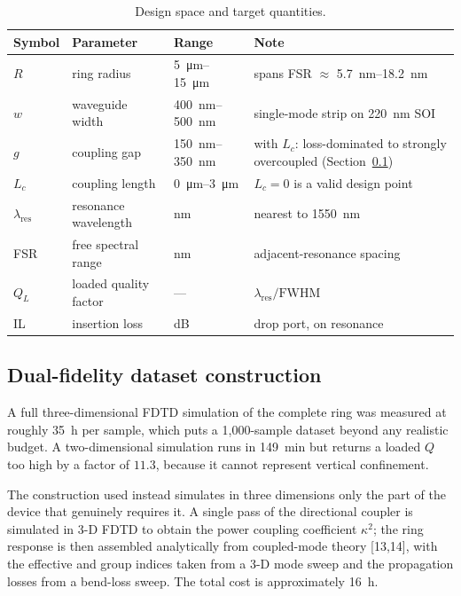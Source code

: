 \documentclass[11pt]{article}
\newcommand{\lres}{\lambda_{\mathrm{res}}}
\newcommand{\QL}{Q_L}
\begin{document}
\begin{table}[!tbp]
\centering
\caption{Design space and target quantities.}
\label{tab:space}
\small
\begin{tabular}{@{}llll@{}}
\toprule
Symbol & Parameter & Range & Note \\
\midrule
$R$    & ring radius      & \SIrange{5}{15}{\micro\metre} & spans FSR $\approx$ \SIrange{5.7}{18.2}{nm} \\
$w$    & waveguide width  & \SIrange{400}{500}{nm}        & single-mode strip on \SI{220}{nm} SOI \\
$g$    & coupling gap     & \SIrange{150}{350}{nm}        & with $L_c$: loss-dominated to strongly overcoupled (Section~\ref{sec:data}) \\
$L_c$  & coupling length  & \SIrange{0}{3}{\micro\metre}  & $L_c = 0$ is a valid design point \\
\midrule
$\lres$ & resonance wavelength & nm & nearest to \SI{1550}{nm} \\
FSR     & free spectral range  & nm & adjacent-resonance spacing \\
$\QL$   & loaded quality factor & --- & $\lres/\mathrm{FWHM}$ \\
IL      & insertion loss        & dB & drop port, on resonance \\
\bottomrule
\end{tabular}
\end{table}

\subsection{Dual-fidelity dataset construction}\label{sec:data}

A full three-dimensional FDTD simulation of the complete ring was measured at
roughly \SI{35}{\hour} per sample, which puts a 1{,}000-sample dataset beyond
any realistic budget. A two-dimensional simulation runs in
\SI{149}{\minute} but returns a loaded $Q$ too high by a factor of
$11.3$, because it cannot represent vertical confinement.

The construction used instead simulates in three dimensions only the part of
the device that genuinely requires it. A single pass of the directional
coupler is simulated in 3-D FDTD to obtain the power coupling coefficient
$\kappa^2$; the ring response is then assembled analytically from coupled-mode
theory [13,14], with the effective and group indices taken from a 3-D mode
sweep and the propagation losses from a bend-loss sweep. The total cost is
approximately \SI{16}{\hour}.
\end{document}
